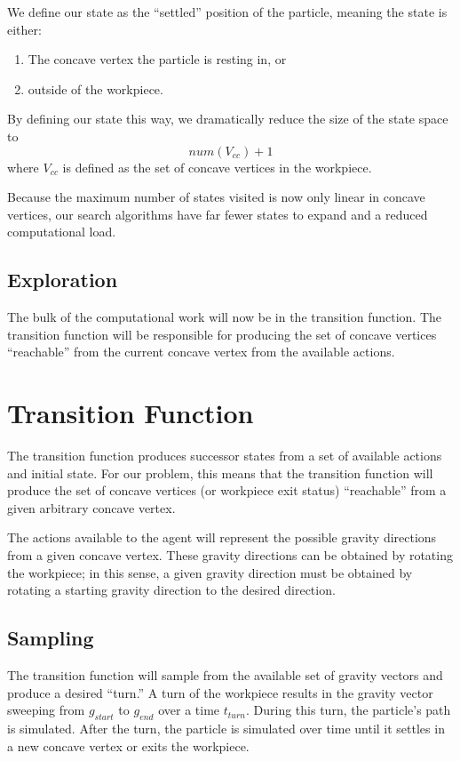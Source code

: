 We define our state as the ``settled'' position of the particle, meaning the state is either:

\begin{enumerate}
\item The concave vertex the particle is resting in, or
\item outside of the workpiece.
\end{enumerate}

By defining our state this way, we dramatically reduce the size of the state space to
$$
num(V_{cc}) + 1
$$
where $V_{cc}$ is defined as the set of concave vertices in the workpiece.

Because the maximum number of states visited is now only linear in concave vertices, our search algorithms have far fewer states to expand and a reduced computational load.

	\subsection{Exploration}

The bulk of the computational work will now be in the transition function. The transition function will be responsible for producing the set of concave vertices ``reachable'' from the current concave vertex from the available actions.

\section{Transition Function}

The transition function produces successor states from a set of available actions and initial state. For our problem, this means that the transition function will produce the set of concave vertices (or workpiece exit status) ``reachable'' from a given arbitrary concave vertex.

The actions available to the agent will represent the possible gravity directions from a given concave vertex. These gravity directions can be obtained by rotating the workpiece; in this sense, a given gravity direction must be obtained by rotating a starting gravity direction to the desired direction.

	\subsection{Sampling}

The transition function will sample from the available set of gravity vectors and produce a desired ``turn.'' A turn of the workpiece results in the gravity vector sweeping from $g_{start}$ to $g_{end}$ over a time $t_{turn}$. During this turn, the particle's path is simulated. After the turn, the particle is simulated over time until it settles in a new concave vertex or exits the workpiece.

